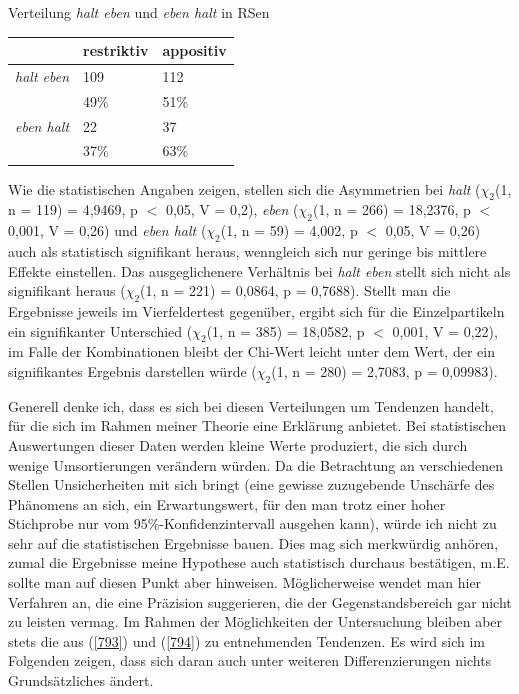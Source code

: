 \begin{exe}
	\ex\label{794} Verteilung \textit{halt eben} und \textit{eben halt} in RSen\\[-1em]
     \begin{tabular}[t]{|l|l|l|}
     \hline
	 {} & \textbf{restriktiv} & \textbf{appositiv}\\
	 \hline
	 \textit{halt eben} & 109 & 112\\
	 \hline
	 & 49\% & 51\%\\
	 \hline\hline
	 \textit{eben halt} & 22 & 37\\
	 \hline
	 & 37\% & 63\%\\
	 \hline       
     \end{tabular}
\end{exe}
Wie die statistischen Angaben zeigen, stellen sich die Asymmetrien bei \textit{halt} ($\chi_{2}$(1, n = 119) = 4,9469, p $<$ 0,05, V = 0,2), \textit{eben} ($\chi_{2}$(1, n = 266) = 18,2376, p $<$ 0,001, V = 0,26) und \textit{eben halt} ($\chi_{2}$(1, n = 59) = 4,002, p $<$ 0,05, V = 0,26) auch als statistisch signifikant heraus, wenngleich sich nur geringe bis mittlere Effekte einstellen. Das ausgeglichenere Verhältnis bei \textit{halt eben} stellt sich nicht als signifikant he\-raus ($\chi_{2}$(1, n = 221) = 0,0864, p = 0,7688). Stellt man die Ergebnisse jeweils im Vierfeldertest gegenüber, ergibt sich für die Einzelpartikeln ein signifikanter Unterschied ($\chi_{2}$(1, n = 385) = 18,0582, p $<$ 0,001, V = 0,22), im Falle der Kombinationen bleibt der Chi-Wert leicht unter dem Wert, der ein signifikantes Ergebnis darstellen würde ($\chi_{2}$(1, n = 280) = 2,7083, p = 0,09983).

Generell denke ich, dass es sich bei diesen Verteilungen um Tendenzen handelt, für die sich im Rahmen meiner Theorie eine Erklärung anbietet. Bei statis\-tischen Auswertungen dieser Daten werden kleine Werte produziert, die sich durch wenige Umsortierungen verändern würden. Da die Betrachtung an verschiedenen Stellen Unsicherheiten mit sich bringt (eine gewisse zuzugebende Unschärfe des Phänomens an sich, ein Erwartungswert, für den man trotz einer hoher Stichprobe nur vom 95\%-Konfidenzintervall ausgehen kann), würde ich nicht zu sehr auf die statistischen Ergebnisse bauen. Dies mag sich merkwürdig anhören, zumal die Ergebnisse meine Hypothese auch statistisch durchaus bestätigen, m.E. sollte man auf diesen Punkt aber hinweisen. Möglicherweise wendet man hier Verfahren an, die eine Präzision suggerieren, die der Gegenstandsbe\-reich gar nicht zu leisten vermag. Im Rahmen der Möglichkeiten der Untersuchung bleiben aber stets die aus (\ref{793}) und (\ref{794}) zu entnehmenden Tendenzen. Es wird sich im Folgenden zeigen, dass sich daran auch unter weiteren Differenzierungen nichts Grundsätzliches ändert.\\

